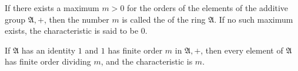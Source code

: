 If there exists a maximum $m > 0$ for the orders of the elements of the additive group $\mathfrak{A},+$, then the number $m$ is called the  of the ring $\mathfrak{A}$. If no such maximum exists, the characteristic is said to be $0$.

If $\mathfrak{A}$ has an identity $1$ and $1$ has finite order $m$ in $\mathfrak{A},+$, then every element of $\mathfrak{A}$ has finite order dividing $m$, and the characteristic is $m$.
